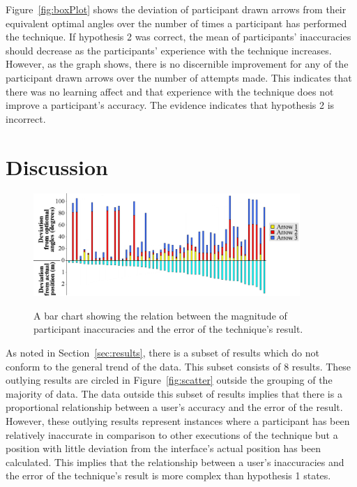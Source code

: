 \documentclass{bmcart}
\begin{document}
Figure~\ref{fig:boxPlot} shows the deviation of participant drawn arrows from their equivalent optimal angles over the number of times a participant has performed the technique.
If hypothesis 2 was correct, the mean of participants' inaccuracies should decrease as the participants' experience with the technique increases.
However, as the graph shows, there is no discernible improvement for any of the participant drawn arrows over the number of attempts made.
This indicates that there was no learning affect and that experience with the technique does not improve a participant's accuracy.
The evidence indicates that hypothesis 2 is incorrect.


\section*{Discussion}\label{sec:discussion}

\begin{figure}[bp]
   \centering
   \caption{A bar chart showing the relation between the magnitude of participant inaccuracies and the error of the technique's result.}
   \includegraphics[width=0.9\textwidth]{figures/total_deviation_vs_angle_deviations.png}
   \label{fig:barReflect}
\end{figure}

As noted in Section~\ref{sec:results}, there is a subset of results which do not conform to the general trend of the data.
This subset consists of 8 results.
These outlying results are circled in Figure~\ref{fig:scatter} outside the grouping of the majority of data.
The data outside this subset of results implies that there is a proportional relationship between a user's accuracy and the error of the result.
However, these outlying results represent instances where a participant has been relatively inaccurate in comparison to other executions of the technique but a position with little deviation from the interface's actual position has been calculated.
This implies that the relationship between a user's inaccuracies and the error of the technique's result is more complex than hypothesis 1 states.
\end{document}
